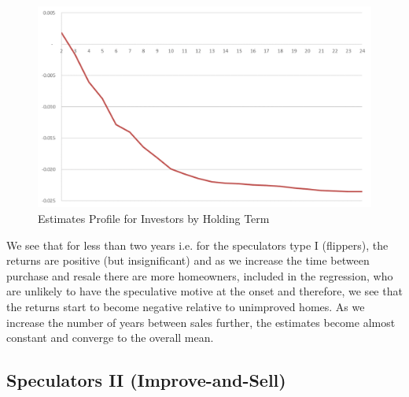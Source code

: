 \documentclass[AEJ,reqno, draftmode]{AEA} %
\begin{document}
\begin{figure}[!ht]
    \centering
     \includegraphics[width=\columnwidth]{Figures/regression_24_after_ACT_NT.png} \par
 \caption{Estimates Profile for Investors by Holding Term}
 \vspace{-20pt}
 \label{fig:relative_returns_by_investor}
\end{figure} 



We see that for less than two years i.e. for the speculators type I (flippers), the returns are positive (but insignificant) and as we increase the time between purchase and resale there are more homeowners, included in the regression, who are unlikely to have the speculative motive at the onset and therefore, we see that the returns start to become negative relative to unimproved homes. As we increase the number of years between sales further, the estimates become almost constant and converge to the overall mean. 


\subsection{Speculators II (Improve-and-Sell)}
\end{document}
